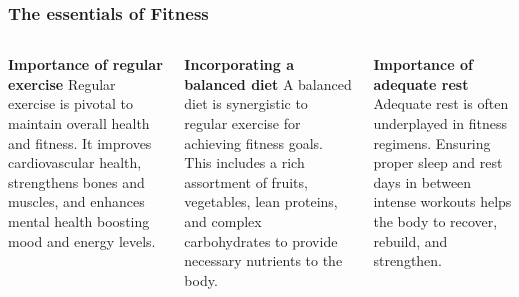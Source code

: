\documentclass[5pt]{beamer}
\begin{document}
\begin{frame}
\frametitle{The essentials of Fitness}
\begin{columns}
\begin{column}{0.3\textwidth}
\begin{block}{\textbf{Importance of regular exercise}}
Regular exercise is pivotal to maintain overall health and fitness. It improves cardiovascular health, strengthens bones and muscles, and enhances mental health boosting mood and energy levels.
\end{block}
\end{column}
\begin{column}{0.3\textwidth}
\begin{block}{\textbf{Incorporating a balanced diet}}
A balanced diet is synergistic to regular exercise for achieving fitness goals. This includes a rich assortment of fruits, vegetables, lean proteins, and complex carbohydrates to provide necessary nutrients to the body.
\end{block}
\end{column}
\begin{column}{0.3\textwidth}
\begin{block}{\textbf{Importance of adequate rest}}
Adequate rest is often underplayed in fitness regimens. Ensuring proper sleep and rest days in between intense workouts helps the body to recover, rebuild, and strengthen.
\end{block}
\end{column}
\end{columns}
\end{frame}
\end{document}
